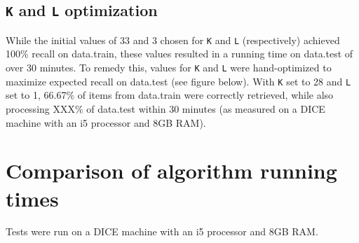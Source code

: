 \documentclass{article}
\begin{document}
\subsection{\texttt{K} and \texttt{L} optimization}
While the initial values of 33 and 3 chosen for \texttt{K} and \texttt{L} (respectively) achieved 100\% recall on data.train, these values resulted in a running time on data.test of over 30 minutes. To remedy this, values for \texttt{K} and \texttt{L} were hand-optimized to maximize expected recall on data.test (see figure below). With \texttt{K} set to 28 and \texttt{L} set to 1, 66.67\% of items from data.train were correctly retrieved, while also processing XXX\% of data.test within 30 minutes (as measured on a DICE machine with an i5 processor and 8GB RAM).

\section{Comparison of algorithm running times}
Tests were run on a DICE machine with an i5 processor and 8GB RAM.
%
\end{document}
